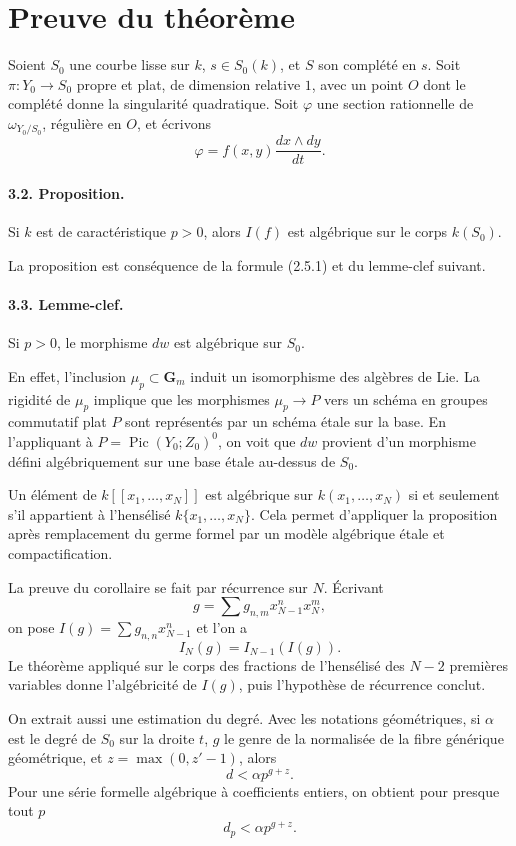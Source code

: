 \documentclass[11pt]{article}
\DeclareMathOperator{\Pic}{Pic}
\newcommand{\Gm}{\mathbf G_m}
\begin{document}
\section{Preuve du théorème}

Soient $S_0$ une courbe lisse sur $k$, $s\in S_0(k)$, et $S$ son complété en $s$. Soit $\pi:Y_0\to S_0$ propre et plat, de dimension relative $1$, avec un point $O$ dont le complété donne la singularité quadratique. Soit $\varphi$ une section rationnelle de $\omega_{Y_0/S_0}$, régulière en $O$, et écrivons
\[
 \varphi=f(x,y)\frac{dx\wedge dy}{dt}.
\]

\paragraph{3.2. Proposition.} Si $k$ est de caractéristique $p>0$, alors $I(f)$ est algébrique sur le corps $k(S_0)$.

La proposition est conséquence de la formule (2.5.1) et du lemme-clef suivant.

\paragraph{3.3. Lemme-clef.} Si $p>0$, le morphisme $dw$ est algébrique sur $S_0$.

En effet, l'inclusion $\mu_p\subset\Gm$ induit un isomorphisme des algèbres de Lie. La rigidité de $\mu_p$ implique que les morphismes $\mu_p\to P$ vers un schéma en groupes commutatif plat $P$ sont représentés par un schéma étale sur la base. En l'appliquant à $P=\Pic(Y_0;Z_0)^0$, on voit que $dw$ provient d'un morphisme défini algébriquement sur une base étale au-dessus de $S_0$.

Un élément de $k[[x_1,\ldots,x_N]]$ est algébrique sur $k(x_1,\ldots,x_N)$ si et seulement s'il appartient à l'hensélisé $k\{x_1,\ldots,x_N\}$. Cela permet d'appliquer la proposition après remplacement du germe formel par un modèle algébrique étale et compactification.

La preuve du corollaire se fait par récurrence sur $N$. Écrivant
\[
 g=\sum g_{n,m}x_{N-1}^n x_N^m,
\]
on pose $I(g)=\sum g_{n,n}x_{N-1}^n$ et l'on a
\begin{equation}\tag{3.6.1}
 I_N(g)=I_{N-1}(I(g)).
\end{equation}
Le théorème appliqué sur le corps des fractions de l'hensélisé des $N-2$ premières variables donne l'algébricité de $I(g)$, puis l'hypothèse de récurrence conclut.

On extrait aussi une estimation du degré. Avec les notations géométriques, si $\alpha$ est le degré de $S_0$ sur la droite $t$, $g$ le genre de la normalisée de la fibre générique géométrique, et $z=\max(0,z'-1)$, alors
\begin{equation}\tag{3.7.1}
 d<\alpha p^{g+z}.
\end{equation}
Pour une série formelle algébrique à coefficients entiers, on obtient pour presque tout $p$
\begin{equation}\tag{3.7.2}
 d_p<\alpha p^{g+z}.
\end{equation}
\end{document}
